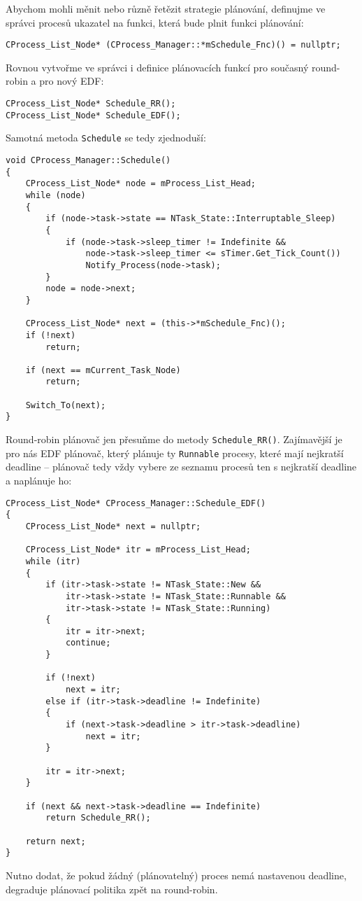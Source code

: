 \documentclass{article}
\begin{document}
Abychom mohli měnit nebo různě řetězit strategie plánování, definujme ve správci procesů ukazatel na funkci, která bude plnit funkci plánování:
\begin{lstlisting}
CProcess_List_Node* (CProcess_Manager::*mSchedule_Fnc)() = nullptr;
\end{lstlisting}

Rovnou vytvořme ve správci i definice plánovacích funkcí pro současný round-robin a pro nový EDF:
\begin{lstlisting}
CProcess_List_Node* Schedule_RR();
CProcess_List_Node* Schedule_EDF();
\end{lstlisting}

Samotná metoda \texttt{Schedule} se tedy zjednoduší:
\begin{lstlisting}
void CProcess_Manager::Schedule()
{
	CProcess_List_Node* node = mProcess_List_Head;
	while (node)
	{
		if (node->task->state == NTask_State::Interruptable_Sleep)
		{
			if (node->task->sleep_timer != Indefinite &&
			    node->task->sleep_timer <= sTimer.Get_Tick_Count())
				Notify_Process(node->task);
		}
		node = node->next;
	}

	CProcess_List_Node* next = (this->*mSchedule_Fnc)();
	if (!next)
		return;

	if (next == mCurrent_Task_Node)
		return;
	
	Switch_To(next);
}
\end{lstlisting}

Round-robin plánovač jen přesuňme do metody \texttt{Schedule\_RR()}. Zajímavější je pro nás EDF plánovač, který plánuje ty \texttt{Runnable} procesy, které mají nejkratší deadline -- plánovač tedy vždy vybere ze seznamu procesů ten s nejkratší deadline a naplánuje ho:
\begin{lstlisting}
CProcess_List_Node* CProcess_Manager::Schedule_EDF()
{
	CProcess_List_Node* next = nullptr;
	
	CProcess_List_Node* itr = mProcess_List_Head;
	while (itr)
	{
		if (itr->task->state != NTask_State::New &&
			itr->task->state != NTask_State::Runnable &&
			itr->task->state != NTask_State::Running)
		{
			itr = itr->next;
			continue;
		}

		if (!next)
			next = itr;
		else if (itr->task->deadline != Indefinite)
		{
			if (next->task->deadline > itr->task->deadline)
				next = itr;
		}
		
		itr = itr->next;
	}

	if (next && next->task->deadline == Indefinite)
		return Schedule_RR();
	
	return next;
}
\end{lstlisting}
Nutno dodat, že pokud žádný (plánovatelný) proces nemá nastavenou deadline, degraduje plánovací politika zpět na round-robin.
\end{document}
